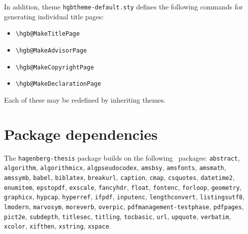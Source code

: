 \documentclass[english]{hgbarticle}
\begin{document}
In addition, theme \texttt{hgbtheme-default.sty} defines the following
commands for generating individual title pages:
%
\begin{itemize}
  \item[] \verb!\hgb@MakeTitlePage!
  \item[] \verb!\hgb@MakeAdvisorPage!
  \item[] \verb!\hgb@MakeCopyrightPage!
  \item[] \verb!\hgb@MakeDeclarationPage!
\end{itemize}
%
Each of these may be redefined by inheriting themes.

\section{Package dependencies}

\begin{sloppypar}
The \texttt{hagenberg-thesis} package builds on the following \latex\ packages:\newline
\texttt{abstract}, 
\texttt{algorithm}, 
\texttt{algorithmicx}, 
\texttt{algpseudocodex}, 
\texttt{amsbsy}, 
\texttt{amsfonts}, 
\texttt{amsmath}, 
\texttt{amssymb}, 
\texttt{babel}, 
\texttt{biblatex}, 
\texttt{breakurl}, 
\texttt{caption}, 
\texttt{cmap}, 
\texttt{csquotes}, 
\texttt{datetime2}, 
\texttt{enumitem}, 
\texttt{epstopdf}, 
\texttt{exscale}, 
\texttt{fancyhdr}, 
\texttt{float}, 
\texttt{fontenc},
\texttt{forloop},
\texttt{geometry}, 
\texttt{graphicx}, 
\texttt{hypcap}, 
\texttt{hyperref}, 
\texttt{ifpdf}, 
\texttt{inputenc}, 
\texttt{lengthconvert},
\texttt{listingsutf8}, 
\texttt{lmodern},
\texttt{marvosym}, 
\texttt{moreverb}, 
\texttt{overpic}, 
\texttt{pdfmanagement-testphase}, 
\texttt{pdfpages}, 
\texttt{pict2e}, 
\texttt{subdepth}, 
\texttt{titlesec}, 
\texttt{titling},
\texttt{tocbasic},
\texttt{url}, 
\texttt{upquote}, 
\texttt{verbatim}, 
\texttt{xcolor}, 
\texttt{xifthen},
\texttt{xstring},
\texttt{xspace}.
\end{sloppypar}
\end{document}
